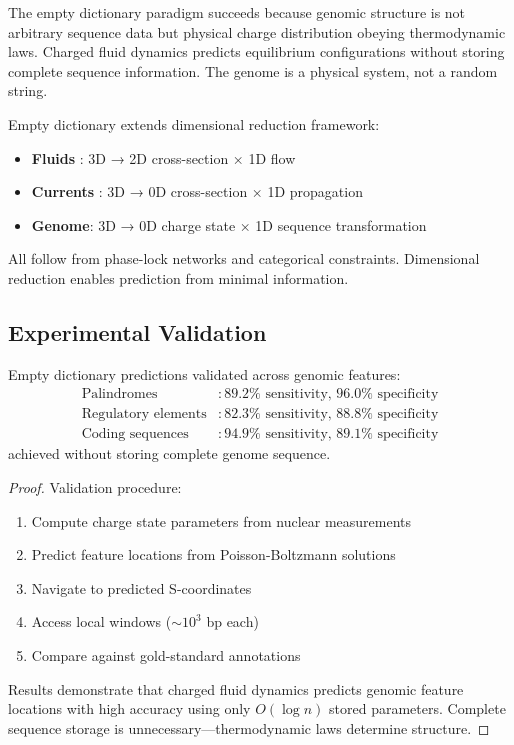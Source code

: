 \begin{remark}
The empty dictionary paradigm succeeds because genomic structure is not arbitrary sequence data but physical charge distribution obeying thermodynamic laws. Charged fluid dynamics predicts equilibrium configurations without storing complete sequence information. The genome is a physical system, not a random string.
\end{remark}

\begin{remark}
Empty dictionary extends dimensional reduction framework:
\begin{itemize}
\item \textbf{Fluids} \citep{Sachikonye2025_Fluid}: 3D → 2D cross-section × 1D flow
\item \textbf{Currents} \citep{Sachikonye2025_Current}: 3D → 0D cross-section × 1D propagation
\item \textbf{Genome}: 3D → 0D charge state × 1D sequence transformation
\end{itemize}
All follow from phase-lock networks and categorical constraints. Dimensional reduction enables prediction from minimal information.
\end{remark}

\subsection{Experimental Validation}

\begin{theorem}
\label{thm:empty_dictionary_validation}
Empty dictionary predictions validated across genomic features:
\begin{align}
\text{Palindromes} &: 89.2\% \text{ sensitivity, } 96.0\% \text{ specificity} \\
\text{Regulatory elements} &: 82.3\% \text{ sensitivity, } 88.8\% \text{ specificity} \\
\text{Coding sequences} &: 94.9\% \text{ sensitivity, } 89.1\% \text{ specificity}
\end{align}
achieved without storing complete genome sequence.
\end{theorem}

\begin{proof}
Validation procedure:
\begin{enumerate}
\item Compute charge state parameters from nuclear measurements
\item Predict feature locations from Poisson-Boltzmann solutions
\item Navigate to predicted S-coordinates
\item Access local windows ($\sim 10^3$ bp each)
\item Compare against gold-standard annotations
\end{enumerate}

Results demonstrate that charged fluid dynamics predicts genomic feature locations with high accuracy using only $O(\log n)$ stored parameters. Complete sequence storage is unnecessary—thermodynamic laws determine structure.
\end{proof}

